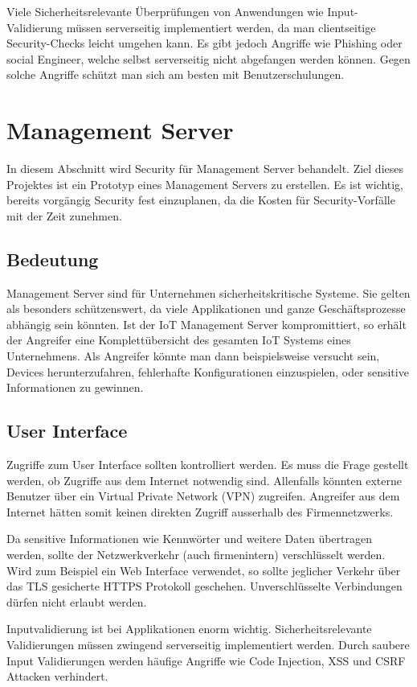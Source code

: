 Viele Sicherheitsrelevante Überprüfungen von Anwendungen wie Input-Validierung müssen serverseitig implementiert werden, da man clientseitige Security-Checks leicht umgehen kann. Es gibt jedoch Angriffe wie Phishing oder social Engineer, welche selbst serverseitig nicht abgefangen werden können. Gegen solche Angriffe schützt man sich am besten mit Benutzerschulungen.

\section{Management Server}
In diesem Abschnitt wird Security für Management Server behandelt. Ziel dieses Projektes ist ein Prototyp eines Management Servers zu erstellen. Es ist wichtig, bereits vorgängig Security fest einzuplanen, da die Kosten für Security-Vorfälle mit der Zeit zunehmen.

\subsection{Bedeutung}
Management Server sind für Unternehmen sicherheitskritische Systeme. Sie gelten als besonders schützenswert, da viele Applikationen und ganze Geschäftsprozesse abhängig sein könnten. Ist der IoT Management Server kompromittiert, so erhält der Angreifer eine Komplettübersicht des gesamten IoT Systems eines Unternehmens. Als Angreifer könnte man dann beispielsweise versucht sein, Devices herunterzufahren, fehlerhafte Konfigurationen einzuspielen, oder sensitive Informationen zu gewinnen.

\subsection{User Interface}
Zugriffe zum User Interface sollten kontrolliert werden. Es muss die Frage gestellt werden, ob Zugriffe aus dem Internet notwendig sind. Allenfalls könnten externe Benutzer über ein Virtual Private Network (VPN) zugreifen. Angreifer aus dem Internet hätten somit keinen direkten Zugriff ausserhalb des Firmennetzwerks.

Da sensitive Informationen wie Kennwörter und weitere Daten übertragen werden, sollte der Netzwerkverkehr (auch firmenintern) verschlüsselt werden. Wird zum Beispiel ein Web Interface verwendet, so sollte jeglicher Verkehr über das TLS gesicherte HTTPS Protokoll geschehen. Unverschlüsselte Verbindungen dürfen nicht erlaubt werden.

Inputvalidierung ist bei Applikationen enorm wichtig. Sicherheitsrelevante Validierungen müssen zwingend serverseitig implementiert werden. Durch saubere Input Validierungen werden häufige Angriffe wie Code Injection, XSS und CSRF Attacken verhindert.

